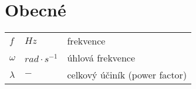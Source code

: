 \section*{Obecné}
\begin{tabular}{lll}
	$f$ & $\unit{Hz}$ & frekvence\\
	$\omega$ & $\unit{rad\cdot s^{-1}}$ & úhlová frekvence\\
	$\lambda$ & $\unit{-}$ & celkový účiník (power factor)\\
\end{tabular}